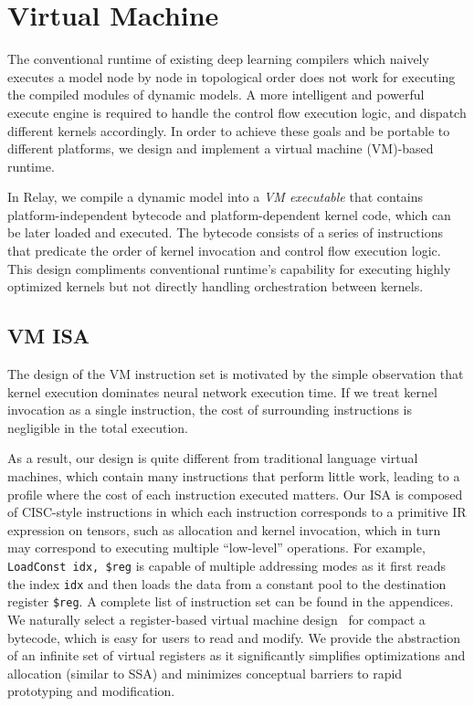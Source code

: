\section{Virtual Machine}
\label{sec:runtime}
The conventional runtime of existing deep learning compilers which naively executes a model node by node in topological order does not work for executing the compiled modules of dynamic models. A more intelligent and powerful execute engine is required to handle the control flow execution logic, and dispatch different kernels accordingly. In order to achieve these goals and be portable to different platforms, we design and implement a virtual machine (VM)-based runtime.

In Relay, we compile a dynamic model into a {\em VM executable} that contains platform-independent bytecode and platform-dependent kernel code, which can be later loaded and executed.
The bytecode consists of a series of instructions that predicate the order of kernel invocation and control flow execution logic.
This design compliments conventional runtime's capability for executing highly optimized kernels but not directly handling orchestration between kernels.

\subsection{VM ISA}

The design of the VM instruction set is motivated by the simple observation that kernel execution dominates neural network execution time. If we treat kernel invocation as a single instruction, the cost of surrounding instructions is negligible in the total execution.

As a result, our design is quite different from traditional language virtual machines, which contain many instructions that perform little work, leading to a profile where the cost of each instruction executed matters.
Our ISA is composed of CISC-style instructions in which each instruction corresponds to a primitive IR expression on tensors, such as allocation and kernel invocation, which in turn may correspond to executing multiple ``low-level'' operations. For example, \texttt{LoadConst idx, \$reg} is capable of multiple addressing modes as it first reads the index \texttt{idx} and then loads the data from a constant pool to the destination register \texttt{\$reg}.
A complete list of instruction set can be found in the appendices.
We naturally select a register-based virtual machine design~\citep{davis2003case} for compact a bytecode, which is easy for users to read and modify. We provide the abstraction of an infinite set of virtual registers as it significantly simplifies optimizations and allocation (similar to SSA) and minimizes conceptual barriers to rapid prototyping and modification.


